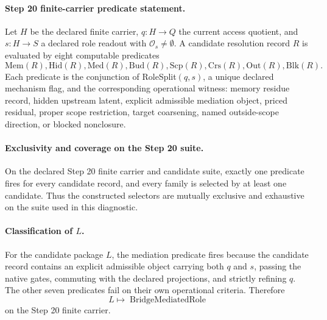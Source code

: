 \paragraph{Step 20 finite-carrier predicate statement.}
Let \(H\) be the declared finite carrier, \(q:H\to Q\) the current
access quotient, and \(s:H\to S\) a declared role readout with
\(\mathcal O_s\neq\emptyset\).  A candidate resolution record \(R\)
is evaluated by eight computable predicates
\[
\mathrm{Mem}(R),\mathrm{Hid}(R),\mathrm{Med}(R),\mathrm{Bud}(R),
\mathrm{Scp}(R),\mathrm{Crs}(R),\mathrm{Out}(R),\mathrm{Blk}(R).
\]
Each predicate is the conjunction of RoleSplit\((q,s)\), a unique
declared mechanism flag, and the corresponding operational witness:
memory residue record, hidden upstream latent, explicit admissible
mediation object, priced residual, proper scope restriction, target
coarsening, named outside-scope direction, or blocked nonclosure.

\paragraph{Exclusivity and coverage on the Step 20 suite.}
On the declared Step 20 finite carrier and candidate suite,
exactly one predicate fires for every candidate record, and every
family is selected by at least one candidate.  Thus the constructed
selectors are mutually exclusive and exhaustive on the suite used in
this diagnostic.

\paragraph{Classification of \(L\).}
For the candidate package \(L\), the mediation predicate fires because
the candidate record contains an explicit admissible object carrying
both \(q\) and \(s\), passing the native gates, commuting with the
declared projections, and strictly refining \(q\).  The other seven
predicates fail on their own operational criteria.  Therefore
\[
  L \mapsto \operatorname{BridgeMediatedRole}
\]
on the Step 20 finite carrier.
